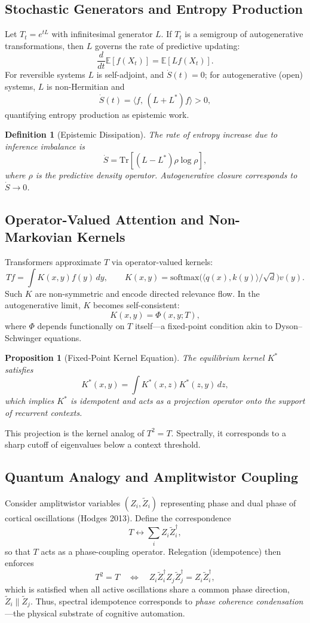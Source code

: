 \documentclass[12pt,a4paper,twoside,openright]{book}
\newtheorem{proposition}[theorem]{Proposition}
\newtheorem{definition}[theorem]{Definition}
\begin{document}
\subsection{Stochastic Generators and Entropy Production}
Let $T_t=e^{tL}$ with infinitesimal generator $L$.
If $T_t$ is a semigroup of autogenerative transformations, then $L$ governs the rate of predictive updating:
\[
\frac{d}{dt}\mathbb{E}[f(X_t)] = \mathbb{E}[Lf(X_t)].
\]
For reversible systems $L$ is self-adjoint, and $\dot{S}(t)=0$; for autogenerative (open) systems, $L$ is non-Hermitian and
\[
\dot{S}(t)=\langle f,\, (L+L^\ast)f\rangle >0,
\]
quantifying entropy production as epistemic work.

\begin{definition}[Epistemic Dissipation]
The rate of entropy increase due to inference imbalance is
\[
\dot{S}=\mathrm{Tr}\!\left[(L-L^\ast)\rho\log\rho\right],
\]
where $\rho$ is the predictive density operator.
Autogenerative closure corresponds to $\dot{S}\to 0$.
\end{definition}

\subsection{Operator-Valued Attention and Non-Markovian Kernels}
Transformers approximate $T$ via operator-valued kernels:
\[
T f = \int K(x,y) f(y)\,dy, \qquad
K(x,y)=\mathrm{softmax}\!\big(\langle q(x),k(y)\rangle/\sqrt{d}\big)v(y).
\]
Such $K$ are non-symmetric and encode directed relevance flow.
In the autogenerative limit, $K$ becomes self-consistent:
\[
K(x,y)=\Phi(x,y;T),
\]
where $\Phi$ depends functionally on $T$ itself—a fixed-point condition akin to Dyson–Schwinger equations.

\begin{proposition}[Fixed-Point Kernel Equation]
The equilibrium kernel $K^\ast$ satisfies
\[
K^\ast(x,y)=\int K^\ast(x,z)K^\ast(z,y)\,dz,
\]
which implies $K^\ast$ is idempotent and acts as a projection operator onto the support of recurrent contexts.
\end{proposition}
This projection is the kernel analog of $T^2=T$.
Spectrally, it corresponds to a sharp cutoff of eigenvalues below a context threshold.

\subsection{Quantum Analogy and Amplitwistor Coupling}
Consider amplitwistor variables $(Z_i,\tilde Z_i)$ representing phase and dual phase of cortical oscillations (Hodges 2013).
Define the correspondence
\[
T \leftrightarrow \sum_i Z_i \tilde Z_i^\dagger,
\]
so that $T$ acts as a phase-coupling operator.
Relegation (idempotence) then enforces
\[
T^2=T \quad \Leftrightarrow \quad Z_i \tilde Z_i^\dagger Z_j \tilde Z_j^\dagger = Z_i \tilde Z_i^\dagger,
\]
which is satisfied when all active oscillations share a common phase direction, $\tilde Z_i \parallel \tilde Z_j$.
Thus, spectral idempotence corresponds to \emph{phase coherence condensation}—the physical substrate of cognitive automation.
\end{document}
